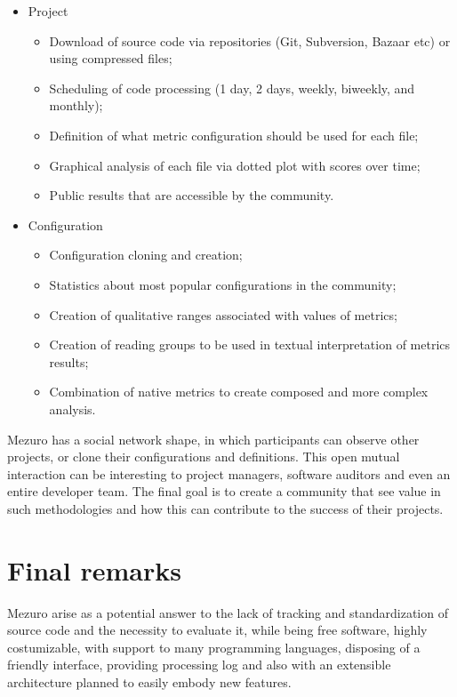 \documentclass{llncs}
\begin{document}
\begin{itemize}
    \item Project

    \begin{itemize}
        \item Download of source code via repositories (Git, Subversion, Bazaar etc) or using compressed files;
        \item Scheduling of code processing (1 day, 2 days, weekly, biweekly, and monthly);
        \item Definition of what metric configuration should be used for each file;
        \item Graphical analysis of each file via dotted plot with scores over time;
        \item Public results that are accessible by the community.
    \end{itemize}
    \item Configuration
    \begin{itemize}
        \item Configuration cloning and creation;
        \item Statistics about most popular configurations in the community;
        \item Creation of qualitative ranges associated with values of metrics;
        \item Creation of reading groups to be used in textual interpretation of metrics results;
        \item Combination of native metrics to create composed and more complex analysis.
    \end{itemize}
\end{itemize}


Mezuro has a social network shape, in which participants can observe other
projects, or clone their configurations and definitions. This open mutual
interaction can be interesting to project managers, software
auditors and even an entire developer team. The final goal is to create a
community that see value in such methodologies and how this can contribute
to the success of their projects.

\section{Final remarks}

Mezuro arise as a potential answer to the lack of tracking and standardization
of source code and the necessity to evaluate it, while being free software,
highly costumizable, with support to many programming languages, disposing of
a friendly interface, providing processing log and also with an extensible
architecture planned to easily embody new features.




\end{document}

